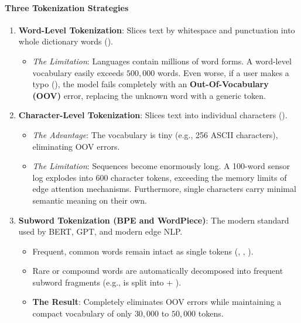 \paragraph{Three Tokenization Strategies}
\begin{enumerate}
    \item \textbf{Word-Level Tokenization}: Slices text by whitespace and punctuation into whole dictionary words ().
    \begin{itemize}
        \item \emph{The Limitation}: Languages contain millions of word forms. A word-level vocabulary easily exceeds $500{,}000$ words. Even worse, if a user makes a typo (), the model fails completely with an \textbf{Out-Of-Vocabulary (OOV)} error, replacing the unknown word with a generic \code{[UNK]} token.
    \end{itemize}
    \item \textbf{Character-Level Tokenization}: Slices text into individual characters (\code{['M', 'o', 't', 'o', 'r', ' ']}).
    \begin{itemize}
        \item \emph{The Advantage}: The vocabulary is tiny (e.g., 256 ASCII characters), eliminating OOV errors.
        \item \emph{The Limitation}: Sequences become enormously long. A 100-word sensor log explodes into 600 character tokens, exceeding the memory limits of edge attention mechanisms. Furthermore, single characters carry minimal semantic meaning on their own.
    \end{itemize}
    \item \textbf{Subword Tokenization (BPE and WordPiece)}: The modern standard used by BERT, GPT, and modern edge NLP.
    \begin{itemize}
        \item Frequent, common words remain intact as single tokens (, , ).
        \item Rare or compound words are automatically decomposed into frequent subword fragments (e.g.,  is split into  + ).
        \item \textbf{The Result}: Completely eliminates OOV errors while maintaining a compact vocabulary of only $30{,}000$ to $50{,}000$ tokens.
    \end{itemize}
\end{enumerate}

